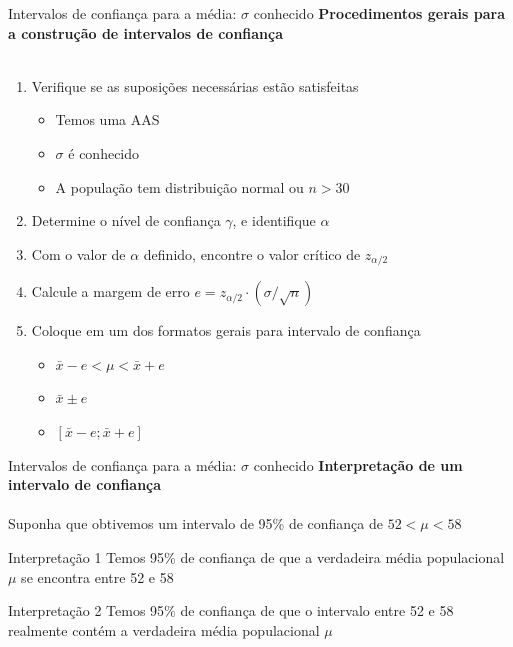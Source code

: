 \documentclass[10pt]{beamer}\usepackage[]{graphicx}\usepackage[]{color}
\theoremstyle{definition}
\begin{document}
\begin{frame}{Intervalos de confiança para a média: $\sigma$ conhecido}
  \textbf{Procedimentos gerais para a construção de intervalos de confiança}
  \\~\\
  \begin{enumerate}
  \item Verifique se as suposições necessárias estão satisfeitas
    \begin{itemize}
    \item Temos uma AAS
    \item $\sigma$ é conhecido
    \item A população tem distribuição normal ou $n>30$
    \end{itemize}
  \item Determine o nível de confiança $\gamma$, e identifique $\alpha$
  \item Com o valor de $\alpha$ definido, encontre o valor crítico de
    $z_{\alpha/2}$
  \item Calcule a margem de erro $e = z_{\alpha/2} \cdot (\sigma/\sqrt{n})$
  \item Coloque em um dos formatos gerais para intervalo de confiança
    \begin{itemize}
    \item[] $\bar{x} - e < \mu < \bar{x} + e$
    \item[] $\bar{x} \pm e$
    \item[] $[\bar{x} - e; \bar{x} + e]$
    \end{itemize}
  \end{enumerate}
\end{frame}

\begin{frame}{Intervalos de confiança para a média: $\sigma$ conhecido}
  \textbf{Interpretação de um intervalo de confiança} \\~\\
  Suponha que obtivemos um intervalo de 95\% de confiança de $52 < \mu <
  58$
  \begin{block}{Interpretação 1}
    Temos 95\% de confiança de que a verdadeira média populacional $\mu$
    se encontra entre 52 e 58
  \end{block}
  \begin{block}{Interpretação 2}
    Temos 95\% de confiança de que o intervalo entre 52 e 58 realmente
    contém a verdadeira média populacional $\mu$
  \end{block}
\end{frame}
\end{document}
